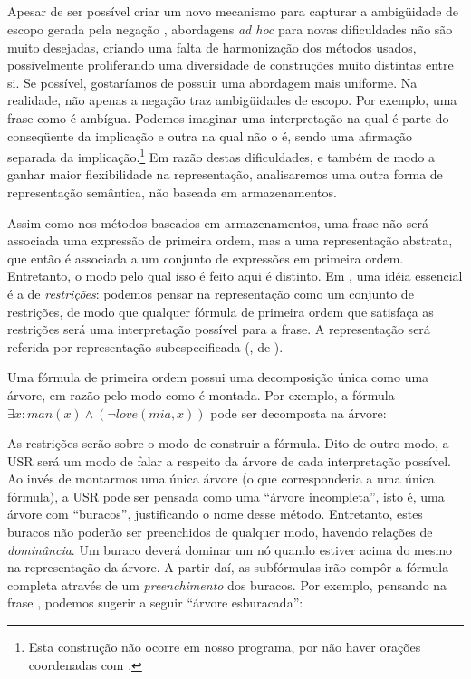 \subsection{}

Apesar de ser possível criar um novo mecanismo para capturar a ambigüidade de escopo gerada pela negação , abordagens \textit{ad hoc} para novas dificuldades não são muito desejadas, criando uma falta de harmonização dos métodos usados, possivelmente proliferando uma diversidade de construções muito distintas entre si. Se possível, gostaríamos de possuir uma abordagem mais uniforme. Na realidade, não apenas a negação traz ambigüidades de escopo. Por exemplo, uma frase como  é ambígua. \cite{HoleSem} Podemos imaginar uma interpretação na qual  é parte do conseqüente da implicação e outra na qual não o é, sendo uma afirmação separada da implicação.\footnote{Esta construção não ocorre em nosso programa, por não haver orações coordenadas com .} Em razão destas dificuldades, e também de modo a ganhar maior flexibilidade na representação, analisaremos uma outra forma de representação semântica, não baseada em armazenamentos. 

Assim como nos métodos baseados em armazenamentos, uma frase não será associada uma expressão de primeira ordem, mas a uma representação abstrata, que então é associada a um conjunto de expressões em primeira ordem. Entretanto, o modo pelo qual isso é feito aqui é distinto. Em , uma idéia essencial é a de \textit{restrições}: podemos pensar na representação como um conjunto de restrições, de modo que qualquer fórmula de primeira ordem que satisfaça as restrições será uma interpretação possível para a frase. \cite[p.~129]{BlackburnBos:2005} A representação será referida por representação subespecificada (, de ).

Uma fórmula de primeira ordem possui uma decomposição única como uma árvore, em razão pelo modo como é montada. Por exemplo, a fórmula $\exists x: man(x) \land (\neg love(mia,x))$ pode ser decomposta na árvore:


As restrições serão sobre o modo de construir a fórmula. Dito de outro modo, a USR será um modo de falar a respeito da árvore de cada interpretação possível. Ao invés de montarmos uma única árvore (o que corresponderia a uma única fórmula), a USR pode ser pensada como uma ``árvore incompleta'', isto é, uma árvore com ``buracos'', justificando o nome desse método. Entretanto, estes buracos não poderão ser preenchidos de qualquer modo, havendo relações de \textit{dominância}. Um buraco deverá dominar um nó quando estiver acima do mesmo na representação da árvore. A partir daí, as subfórmulas irão compôr a fórmula completa através de um \textit{preenchimento} dos buracos. Por exemplo, pensando na frase , podemos sugerir a seguir ``árvore esburacada'':

